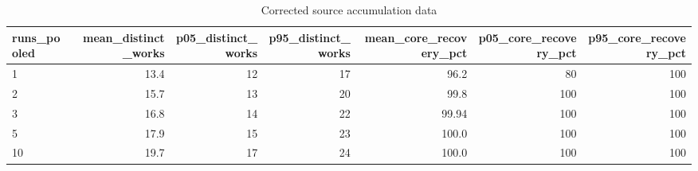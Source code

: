\begin{table}[ht]
\centering
\caption{Corrected source accumulation data}
\scriptsize
\begin{tabular}{lrrrrrr}
\toprule
runs\_pooled & mean\_distinct\_works & p05\_distinct\_works & p95\_distinct\_works & mean\_core\_recovery\_pct & p05\_core\_recovery\_pct & p95\_core\_recovery\_pct \\
\midrule
1 & 13.4 & 12 & 17 & 96.2 & 80 & 100 \\
2 & 15.7 & 13 & 20 & 99.8 & 100 & 100 \\
3 & 16.8 & 14 & 22 & 99.94 & 100 & 100 \\
5 & 17.9 & 15 & 23 & 100.0 & 100 & 100 \\
10 & 19.7 & 17 & 24 & 100.0 & 100 & 100 \\
\bottomrule
\end{tabular}
\end{table}

